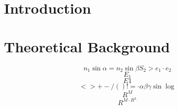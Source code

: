 \documentclass[a4paper,12pt]{book}
\title{}
\author{}
\date{}
\begin{document}
\frontmatter

%
\maketitle

\tableofcontents

\mainmatter

\chapter{Introduction}




\chapter{Theoretical Background}








\begin{equation}
n_1 \sin \alpha = n_2 \sin \beta
S_2>e_1\cdot e_2
\end{equation}
\begin{equation}
E_1
\end{equation}
\begin{equation}
E1
\end{equation}
\begin{equation}
<>+-/()!= \cdot \alpha \beta \gamma \sin \log
\end{equation}
\begin{equation}
R^{M}
\end{equation}
\begin{equation}
R^{M \cdot R^L}
\end{equation}





\backmatter
\appendix



\end{document}
